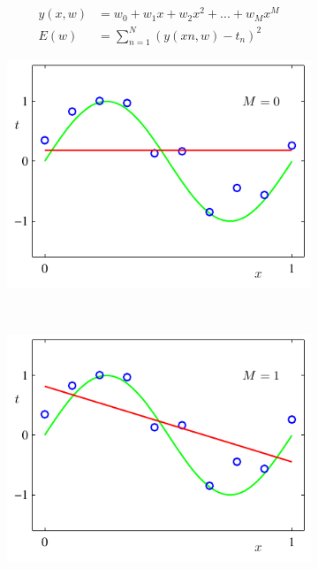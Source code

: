 \begin{align*}
	y(x,w) &= w_0 + w_1x + w_2x^2 + . . . + w_Mx^M\\
	E(w) &= \sum_{n=1}^N (y(xn, w) - t_n)^2
\end{align*}

\begin{figure}
	\centering
	\begin{subfigure}[b]{0.45\textwidth}
                \centering
                \includegraphics[width=\textwidth]{./lecture1/Figure1_4a}
    \end{subfigure}%
	~
	\begin{subfigure}[b]{0.45\textwidth}
                \centering
                \includegraphics[width=\textwidth]{./lecture1/Figure1_4b}
    \end{subfigure}%
    

\end{figure}
